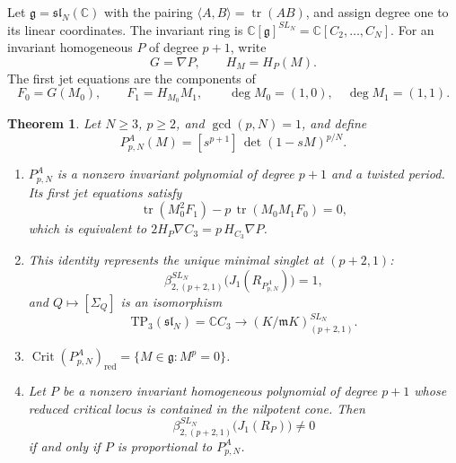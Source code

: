 \documentclass[10pt,reqno]{amsart}
\numberwithin{equation}{section}
\theoremstyle{plain}
\newtheorem{theorem}{Theorem}[section]
\theoremstyle{definition}
\DeclareMathOperator{\tr}{tr}
\DeclareMathOperator{\Crit}{Crit}
\newcommand{\red}{\mathrm{red}}
\newcommand{\TP}{\mathrm{TP}}
\newcommand{\ip}[2]{\langle #1, #2\rangle}
\begin{document}
Let $\mathfrak{g}=\mathfrak{sl}_N(\mathbb{C})$ with the pairing $\ip AB=\tr(AB)$, and assign degree one to its linear coordinates. The invariant ring is $\mathbb{C}[\mathfrak{g}]^{SL_N}=\mathbb{C}[C_2,\dots,C_N]$. For an invariant homogeneous $P$ of degree $p+1$, write 
\begin{equation*}
    G=\nabla P,\qquad H_M=H_P(M).
\end{equation*}
The first jet equations are the components of
\begin{equation*}
	F_0=G(M_0),\qquad F_1=H_{M_0}M_1,\qquad \deg M_0=(1,0),\quad\deg M_1=(1,1).
\end{equation*}

\begin{theorem}\label{thm:typeA}
Let $N\ge3$, $p\ge2$, and $\gcd(p,N)=1$, and define
\begin{equation}\label{eq:PA}
	P^A_{p,N}(M)=[s^{p+1}]\,\det(1-sM)^{p/N}.
\end{equation}
\begin{enumerate}[label=(\arabic*)]
\item $P^A_{p,N}$ is a nonzero invariant polynomial of degree $p+1$ and a twisted period. Its first jet equations satisfy
\begin{equation}\label{eq:Aidentity}
	\tr(M_0^2F_1)-p\,\tr(M_0M_1F_0)=0,
\end{equation}
which is equivalent to $2H_P\nabla C_3=p\,H_{C_3}\nabla P$.
\item This identity represents the unique minimal singlet at $(p+2,1)$:
\begin{equation}
	\beta^{SL_N}_{2,(p+2,1)}\big(J_1(R_{P^A_{p,N}})\big)=1,
\end{equation}
and $Q\mapsto[\Sigma_Q]$ is an isomorphism
\begin{equation}
	\TP_3(\mathfrak{sl}_N)=\mathbb{C} C_3\longrightarrow(K/\mathfrak{m} K)^{SL_N}_{(p+2,1)}.
\end{equation}
\item $\Crit(P^A_{p,N})_\red=\{M\in\mathfrak{g}: M^p=0\}$.
\item Let $P$ be a nonzero invariant homogeneous polynomial of degree $p+1$ whose reduced critical locus is contained in the nilpotent cone. Then
\begin{equation*}
	\beta^{SL_N}_{2,(p+2,1)}\big(J_1(R_P)\big)\neq 0
\end{equation*}
if and only if $P$ is proportional to $P^A_{p,N}$.
\end{enumerate}
\end{theorem}
\end{document}
